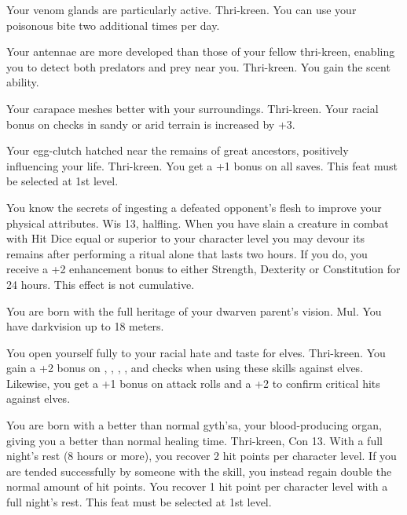 
{Your venom glands are particularly active.}
{Thri-kreen.}
{You can use your poisonous bite two additional times per day.}
{}{}

{Your antennae are more developed than those of your fellow thri-kreen, enabling you to detect both predators and prey near you.}
{Thri-kreen.}
{You gain the scent ability.}
{}{}

{Your carapace meshes better with your surroundings.}
{Thri-kreen.}
{Your racial bonus on  checks in sandy or arid terrain is increased by +3.}
{}{}

{Your egg-clutch hatched near the remains of great ancestors, positively influencing your life.}
{Thri-kreen.}
{You get a +1 bonus on all saves.}
{}
{This feat must be selected at 1st level.}

{You know the secrets of ingesting a defeated opponent's flesh to improve your physical attributes.}
{Wis 13, halfling.}
{When you have slain a creature in combat with Hit Dice equal or superior to your character level you may devour its remains after performing a ritual alone that lasts two hours. If you do, you receive a +2 enhancement bonus to either Strength, Dexterity or Constitution for 24 hours. This effect is not cumulative.}
{}{}

{You are born with the full heritage of your dwarven parent's vision.}
{Mul.}
{You have darkvision up to 18 meters.}
{}{}

{You open yourself fully to your racial hate and taste for elves.}
{Thri-kreen.}
{You gain a +2 bonus on , , , , and  checks when using these skills against elves. Likewise, you get a +1 bonus on attack rolls and a +2 to confirm critical hits against elves.}
{}{}

{You are born with a better than normal gyth'sa, your blood-producing organ, giving you a better than normal healing time.}
{Thri-kreen, Con 13.}
{With a full night's rest (8 hours or more), you recover 2 hit points per character level. If you are tended successfully by someone with the  skill, you instead regain double the normal amount of hit points.}
{You recover 1 hit point per character level with a full night's rest.}
{This feat must be selected at 1st level.}

